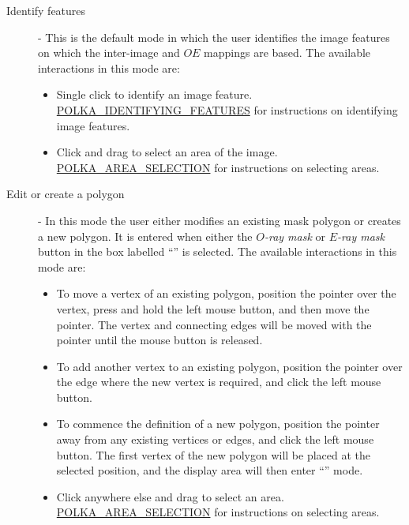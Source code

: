 \begin{description}

\item [ Identify features] - This is the default
mode in which the user identifies the image features on which the
inter-image and $OE$ mappings are based. The available interactions in
this mode are:

\begin{itemize}

\item Single click to identify an image feature. \hyperref{Go here}{See
section }{}{POLKA_IDENTIFYING_FEATURES} for instructions on identifying 
image features. 

\item Click and drag to select an area of the image. \hyperref{Go here}{See
section }{}{POLKA_AREA_SELECTION} for instructions on selecting areas.

\end{itemize}

\item [ Edit or create a polygon] - In this mode
the user either modifies an existing mask polygon or creates a new
polygon. It is entered when either the {\em $O$-ray mask} or {\em $E$-ray
mask} button in the box labelled ``'' is selected. The available interactions in
this mode are:

\begin{itemize}

\item To move a vertex of an existing polygon, position the pointer over
the vertex, press and hold the left mouse button, and then move the
pointer. The vertex and connecting edges will be moved with the pointer
until the mouse button is released.

\item To add another vertex to an existing polygon, position the pointer 
over the edge where the new vertex is required, and click the left mouse
button. 

\item To commence the definition of a new polygon, position the pointer
away from any existing vertices or edges, and click the left mouse button.
The first vertex of the new polygon will be placed at the selected
position, and the display area will then enter ``'' mode.

\item Click anywhere else and drag to select an area. \hyperref{Go here}{See
section }{}{POLKA_AREA_SELECTION} for instructions on selecting areas.


\end{itemize}
\end{description}

